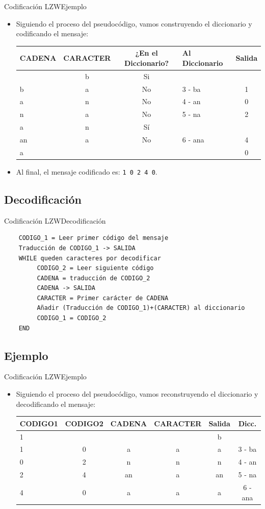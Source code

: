 \documentclass[10pt,compress]{beamer} %
\begin{document}
\begin{frame}{Codificación LZW}{Ejemplo}
	\begin{itemize}
    \item Siguiendo el proceso del pseudocódigo, vamos construyendo el diccionario y codificando el mensaje:
    \begin{tabular}{lcclc}
      CADENA & CARACTER  & ¿En el Diccionario? & Al Diccionario & Salida \\
      \hline
         & b & Si &  &  \\
       b & a & No & 3 - ba & 1 \\
       a & n & No & 4 - an & 0 \\
       n & a & No & 5 - na & 2 \\
       a & n & Sí & 		&  \\
       an & a & No & 6 - ana & 4 \\
       a & & & & 0 \\ 	
      \end{tabular}
    \item Al final, el mensaje codificado es: \texttt{1 0 2 4 0}.
	\end{itemize}
\end{frame}


\subsection{Decodificación}
\begin{frame}[fragile]{Codificación LZW}{Decodificación}
  \footnotesize
  \begin{verbatim}
    CODIGO_1 = Leer primer código del mensaje
    Traducción de CODIGO_1 -> SALIDA
    WHILE queden caracteres por decodificar
         CODIGO_2 = Leer siguiente código
         CADENA = traducción de CODIGO_2
         CADENA -> SALIDA
         CARACTER = Primer carácter de CADENA
         Añadir (Traducción de CODIGO_1)+(CARACTER) al diccionario
         CODIGO_1 = CODIGO_2
    END
\end{verbatim}
\end{frame}

\subsection{Ejemplo}
\begin{frame}{Codificación LZW}{Ejemplo}
	\begin{itemize}
    \item Siguiendo el proceso del pseudocódigo, vamos reconstruyendo el diccionario y decodificando el mensaje:
    \begin{tabular}{lccccc}
      CODIGO1 & CODIGO2  & CADENA & CARACTER & Salida & Dicc.\\
      \hline
      1 &   &   &   & b &\\
      1 & 0 & a & a & a & 3 - ba \\
      0 & 2 & n & n & n & 4 - an \\
      2 & 4 & an & a & an & 5 - na \\
      4 & 0 & a & a & a & 6 - ana \\
      \end{tabular}
	\end{itemize}
\end{frame}
\end{document}
